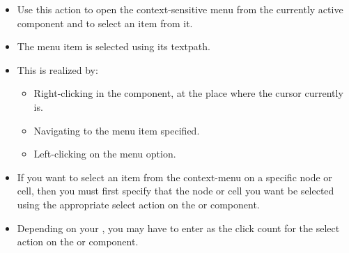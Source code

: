 \begin{itemize}
\item Use this action to open the context-sensitive menu from the currently active component and to select an item from it.
\item The menu item is selected using its textpath. 
\item This is realized by:
\begin{itemize}
\item Right-clicking in the component, at the place where the cursor currently is.
\item Navigating to the menu item specified.
\item Left-clicking on the menu option.  
\end{itemize}
\item If you want to select an item from the context-menu on a specific node or cell, then you must first specify that the node or cell you want be selected using the appropriate select action on the  or  component. 
\item Depending on your \gdaut{}, you may have to enter  as the click count for the select action on the  or  component. 
\end{itemize}


  
